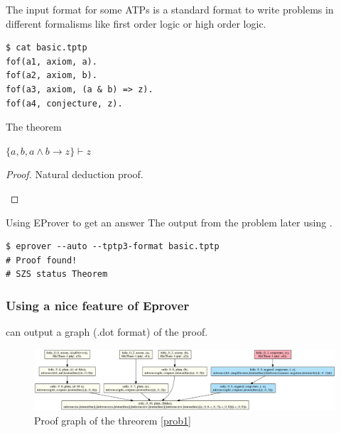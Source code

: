 \documentclass[newPxFont]{beamer}
\begin{document}
\begin{frame}[fragile]{The input format for some ATPs}
 is a standard format to
write problems in different formalisms like
first order logic or high order logic.

\begin{lstlisting}
$ cat basic.tptp
fof(a1, axiom, a).
fof(a2, axiom, b).
fof(a3, axiom, (a & b) => z).
fof(a4, conjecture, z).
\end{lstlisting}

\end{frame}


\begin{frame}[fragile]{The theorem}

\begin{theorem} $\{a, b, a\wedge b \rightarrow z\} \vdash z$
\label{prob1}
\end{theorem}

\begin{proof}
Natural deduction proof.\hfill
\label{basic-der}
\begin{prooftree}

\end{prooftree}
\end{proof}
\end{frame}


\begin{frame}[fragile]{Using EProver to get an answer}
The output from the problem later using \eprover.
\begin{lstlisting}
$ eprover --auto --tptp3-format basic.tptp
# Proof found!
# SZS status Theorem
\end{lstlisting}
\end{frame}


\begin{frame}
\frametitle{Using a nice feature of Eprover}
\eprover can output a graph (.dot format) of the proof.
\begin{figure}[h!]
\includegraphics[scale=0.18]{graphproof}
\caption {Proof graph of the threorem \ref{prob1} }
\end{figure}
\end{frame}
\end{document}
